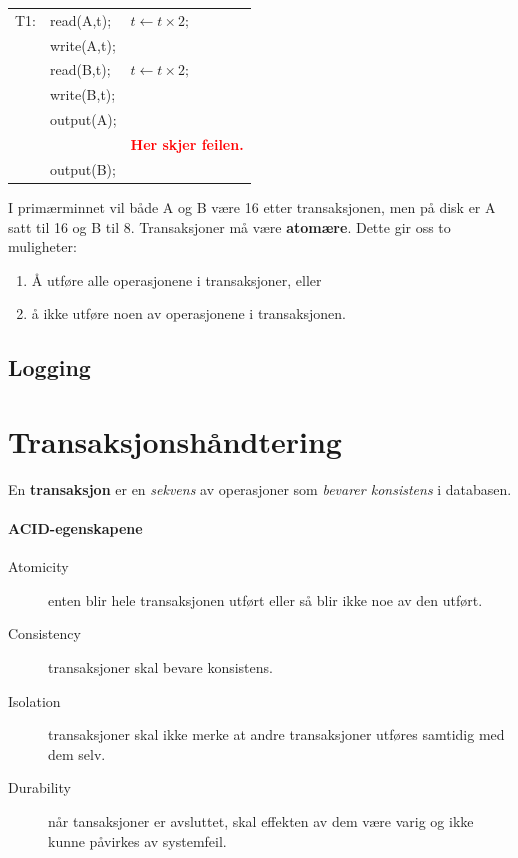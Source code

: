 \documentclass[12pt,a4paper]{article}
\begin{document}
\begin{center}
\begin{tabular}{lll}
T1: & read(A,t); & $t \leftarrow t \times 2;$\\
& write(A,t); &\\
& read(B,t); & $t \leftarrow t \times 2;$\\
& write(B,t); &\\
& output(A);&\\
&&\textbf{\textcolor{red}{Her skjer feilen.}}\\
&output(B);&\\
\end{tabular}
\end{center}

I primærminnet vil både A og B være 16 etter transaksjonen, men på disk er A satt til 16 og B til 8.
Transaksjoner må være \textbf{atomære}. Dette gir oss to muligheter:
\begin{enumerate}
\item{Å utføre alle operasjonene i transaksjoner, eller}
\item{å ikke utføre noen av operasjonene i transaksjonen.}
\end{enumerate}

\subsection{Logging}

\section{Transaksjonshåndtering}
En \textbf{transaksjon} er en \textit{sekvens} av operasjoner som \textit{bevarer konsistens} i databasen.

\paragraph{ACID-egenskapene}
\begin{description}
\item[Atomicity] enten blir hele transaksjonen utført eller så blir ikke noe av den utført.
\item[Consistency] transaksjoner skal bevare konsistens.
\item[Isolation] transaksjoner skal ikke merke at andre transaksjoner utføres samtidig med dem selv.
\item[Durability] når tansaksjoner er avsluttet, skal effekten av dem være varig og ikke kunne påvirkes av systemfeil.
\end{description}
\end{document}

